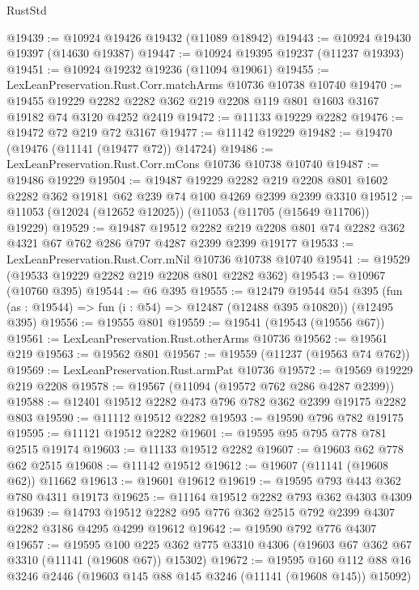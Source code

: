 \begin{lexlean}{RustStd}
\begin{coremodule}
@19439 := @10924 @19426 @19432 (@11089 @18942)
@19443 := @10924 @19430 @19397 (@14630 @19387)
@19447 := @10924 @19395 @19237 (@11237 @19393)
@19451 := @10924 @19232 @19236 (@11094 @19061)
@19455 := LexLeanPreservation.Rust.Corr.matchArms @10736 @10738 @10740
@19470 := @19455
    @19229
    @2282
    @2282
    @362
    @219
    @2208
    @119
    @801
    @1603
    @3167
    @19182
    @74
    @3120
    @4252
    @2419
@19472 := @11133 @19229 @2282
@19476 := @19472 @72 @219 @72 @3167
@19477 := @11142 @19229
@19482 := @19470 (@19476 (@11141 (@19477 @72)) @14724)
@19486 := LexLeanPreservation.Rust.Corr.mCons @10736 @10738 @10740
@19487 := @19486 @19229
@19504 := @19487
    @19229
    @2282
    @219
    @2208
    @801
    @1602
    @2282
    @362
    @19181
    @62
    @239
    @74
    @100
    @4269
    @2399
    @2399
    @3310
@19512 := @11053 (@12024 (@12652 @12025)) (@11053 (@11705 (@15649 @11706)) @19229)
@19529 := @19487
    @19512
    @2282
    @219
    @2208
    @801
    @74
    @2282
    @362
    @4321
    @67
    @762
    @286
    @797
    @4287
    @2399
    @2399
    @19177
@19533 := LexLeanPreservation.Rust.Corr.mNil @10736 @10738 @10740
@19541 := @19529 (@19533 @19229 @2282 @219 @2208 @801 @2282 @362)
@19543 := @10967 (@10760 @395)
@19544 := @6 @395
@19555 := @12479
    @19544
    @54
    @395
    (fun (as : @19544) => fun (i : @54) => @12487 (@12488 @395 @10820))
    (@12495 @395)
@19556 := @19555 @801
@19559 := @19541 (@19543 (@19556 @67))
@19561 := LexLeanPreservation.Rust.otherArms @10736
@19562 := @19561 @219
@19563 := @19562 @801
@19567 := @19559 (@11237 (@19563 @74 @762))
@19569 := LexLeanPreservation.Rust.armPat @10736
@19572 := @19569 @19229 @219 @2208
@19578 := @19567 (@11094 (@19572 @762 @286 @4287 @2399))
@19588 := @12401 @19512 @2282 @473 @796 @782 @362 @2399 @19175 @2282 @803
@19590 := @11112 @19512 @2282
@19593 := @19590 @796 @782 @19175
@19595 := @11121 @19512 @2282
@19601 := @19595 @95 @795 @778 @781 @2515 @19174
@19603 := @11133 @19512 @2282
@19607 := @19603 @62 @778 @62 @2515
@19608 := @11142 @19512
@19612 := @19607 (@11141 (@19608 @62)) @11662
@19613 := @19601 @19612
@19619 := @19595 @793 @443 @362 @780 @4311 @19173
@19625 := @11164 @19512 @2282 @793 @362 @4303 @4309
@19639 := @14793 @19512 @2282 @95 @776 @362 @2515 @792 @2399 @4307 @2282 @3186 @4295 @4299 @19612
@19642 := @19590 @792 @776 @4307
@19657 := @19595
    @100
    @225
    @362
    @775
    @3310
    @4306
    (@19603 @67 @362 @67 @3310 (@11141 (@19608 @67)) @15302)
@19672 := @19595
    @160
    @112
    @88
    @16
    @3246
    @2446
    (@19603 @145 @88 @145 @3246 (@11141 (@19608 @145)) @15092)

\end{coremodule}
\end{lexlean}
